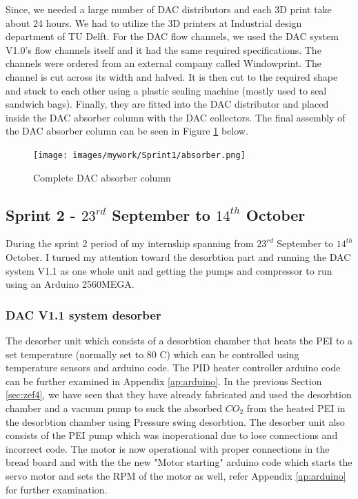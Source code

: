 Since, we needed a large number of DAC distributors and each 3D print take about 24 hours. We had to utilize the 3D printers at Industrial design department of TU Delft. For the DAC flow channels, we used the DAC system V1.0's flow channels itself and it had the same required specifications. The channels were ordered from an external company called Windowprint. The channel is cut across its width and halved. It is then cut to the required shape and stuck to each other using a plastic sealing machine (mostly used to seal sandwich bags). Finally, they are fitted into the DAC distributor and placed inside the DAC absorber column with the DAC collectors. The final assembly of the DAC absorber column can be seen in Figure \ref{fig:absorber} below.  

\begin{figure}[H]
    \centering
    \texttt{[image: images/mywork/Sprint1/absorber.png]}
    \caption{Complete DAC absorber column}
    \label{fig:absorber}
\end{figure}

\subsection{Sprint 2 - $23^{rd}$ September to $14^{th}$ October}
\label{sec:sprint2}

During the sprint 2 period of my internship spanning from $23^{rd}$ September to $14^{th}$ October. I turned my attention toward the desorbtion part and running the DAC system V1.1 as one whole unit and getting the pumps and compressor to run using an Arduino 2560MEGA.  

\subsubsection{DAC V1.1 system desorber}
\label{sec:faultycomp}

The desorber unit which consists of a desorbtion chamber that heats the PEI to a set temperature (normally set to 80 \degree C) which can be controlled using temperature sensors and arduino code. The PID heater controller arduino code can be further examined in Appendix \ref{ap:arduino}. In the previous Section \ref{sec:zef4}, we have seen that they have already fabricated and used the desorbtion chamber and a vacuum pump to suck the absorbed $CO_2$ from the heated PEI in the desorbtion chamber using Pressure swing desorbtion. The desorber unit also consists of the PEI pump which was inoperational due to lose connections and incorrect code. The motor is now operational with proper connections in the bread board and with the the new "Motor starting" arduino code which starts the servo motor and sets the RPM of the motor as well, refer Appendix \ref{ap:arduino} for further examination. %

